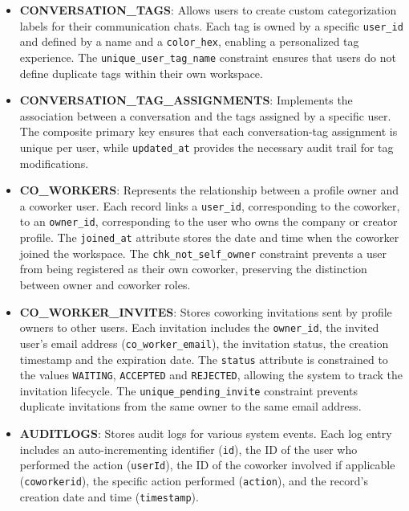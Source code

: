 \begin{itemize}
    \item \textbf{CONVERSATION\_TAGS}: Allows users to create custom categorization labels for their communication chats. Each tag is owned by a specific \texttt{user\_id} and defined by a name and a \texttt{color\_hex}, enabling a personalized tag experience. The \texttt{unique\_user\_tag\_name} constraint ensures that users do not define duplicate tags within their own workspace.

    \item \textbf{CONVERSATION\_TAG\_ASSIGNMENTS}: Implements the association between a conversation and the tags assigned by a specific user. The composite primary key ensures that each conversation-tag assignment is unique per user, while \texttt{updated\_at} provides the necessary audit trail for tag modifications.
 
    \item \textbf{CO\_WORKERS}: Represents the relationship between a profile owner and a coworker user. Each record links a \texttt{user\_id}, corresponding to the coworker, to an \texttt{owner\_id}, corresponding to the user who owns the company or creator profile. The \texttt{joined\_at} attribute stores the date and time when the coworker joined the workspace. The \texttt{chk\_not\_self\_owner} constraint prevents a user from being registered as their own coworker, preserving the distinction between owner and coworker roles.

    \item \textbf{CO\_WORKER\_INVITES}: Stores coworking invitations sent by profile owners to other users. Each invitation includes the \texttt{owner\_id}, the invited user's email address (\texttt{co\_worker\_email}), the invitation status, the creation timestamp and the expiration date. The \texttt{status} attribute is constrained to the values \texttt{WAITING}, \texttt{ACCEPTED} and \texttt{REJECTED}, allowing the system to track the invitation lifecycle. The \texttt{unique\_pending\_invite} constraint prevents duplicate invitations from the same owner to the same email address.

    \item \textbf{AUDITLOGS}: Stores audit logs for various system events. Each log entry includes an auto-incrementing identifier (\texttt{id}), the ID of the user who performed the action (\texttt{userId}), the ID of the coworker involved if applicable (\texttt{coworkerid}), the specific action performed (\texttt{action}), and the record's creation date and time (\texttt{timestamp}).
\end{itemize}

